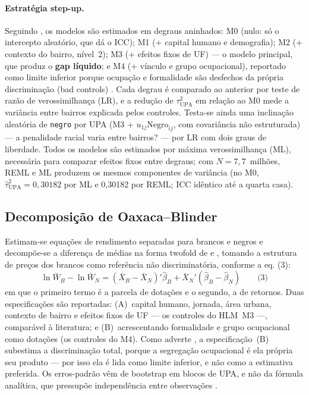 \documentclass[11pt, a4paper, oneside]{article}
\begin{document}
\paragraph{Estratégia {step-up}.} Seguindo , os modelos
são estimados em degraus aninhados: M0 (nulo: só o intercepto aleatório, que dá o ICC);
M1 (+ capital humano e demografia); M2 (+ contexto do bairro, nível~2); M3 (+ efeitos
fixos de UF) --- o modelo principal, que produz o \textbf{gap líquido}; e M4 (+ vínculo
e grupo ocupacional), reportado como {limite inferior} porque ocupação e formalidade
são desfechos da própria discriminação ({bad controls}) \cite{angrist2009}.
Cada degrau é comparado ao anterior por teste de razão de verossimilhança (LR), e a
redução de $\tau^2_{\text{UPA}}$ em relação ao M0 mede a variância entre bairros explicada
pelos controles. Testa-se ainda uma {inclinação aleatória} de \texttt{negro} por UPA
(M3 + $u_{1j}\text{Negro}_{ij}$, com covariância não estruturada) --- a penalidade racial
varia entre bairros? --- por LR com dois graus de liberdade. Todos os modelos são
estimados por máxima verossimilhança (ML), necessária para comparar efeitos fixos entre
degraus; com $N=7{,}7$~milhões, REML e ML produzem os mesmos componentes de variância
(no M0, $\hat\tau^2_{\text{UPA}} = 0,30182$ por ML e 0,30182 por REML;
ICC idêntico até a quarta casa).

\subsection*{Decomposição de Oaxaca--Blinder}
\label{subsec:oaxaca_metodo}

Estimam-se equações de rendimento separadas para brancos e negros e
decompõe-se a diferença de médias na forma {twofold} de
 e , tomando a estrutura de preços dos brancos como
referência não discriminatória, conforme a eq. (3):
\begin{equation*}
\ln \bar W_B - \ln \bar W_N = (\bar X_B - \bar X_N)'\hat\beta_B +
\bar X_N'(\hat\beta_B - \hat\beta_N)
  \qquad\text{(3)}
\end{equation*}
em que o primeiro termo é a parcela de
dotações e o segundo, a de retornos. Duas especificações são reportadas:
(A)~capital humano, jornada, área urbana, contexto de bairro e efeitos fixos de UF ---
os controles do HLM~M3 ---, comparável à literatura; e (B)~acrescentando formalidade e
grupo ocupacional como dotações (os controles do M4). Como
adverte , a especificação~(B) subestima a
discriminação total, porque a segregação ocupacional é ela própria seu
produto --- por isso ela é lida como limite inferior, e não como a estimativa
preferida. Os erros-padrão vêm de bootstrap em blocos de UPA, e não da fórmula
analítica, que pressupõe independência entre observações \cite{cameron2008}.
\end{document}
